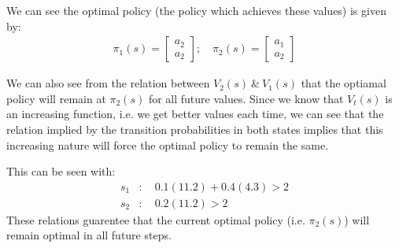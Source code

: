 \documentclass[11pt]{article}
\begin{document}
We can see the optimal policy (the policy which achieves these values) is given by:
\begin{align}
    \pi_1(s) = \begin{bmatrix}
        a_2 \\
        a_2
    \end{bmatrix};\quad
    \pi_2(s) = \begin{bmatrix}
        a_1 \\
        a_2
    \end{bmatrix}
\end{align}

We can also see from the relation between $V_2(s)\ \&\ V_1(s)$ that the optiamal policy will remain at $\pi_2(s)$ for all future values. 
Since we know that $V_t(s)$ is an increasing function, i.e. we get better values each time, we can see that the relation implied by the transition probabilities in both states implies that this increasing nature will force the optimal policy to remain the same. 

This can be seen with:
\begin{align}
    s_1&: \quad 0.1(11.2) + 0.4(4.3)>2 \\
    s_2&: \quad 0.2(11.2) > 2
\end{align}
These relations guarentee that the current optimal policy (i.e. $\pi_2(s)$) will remain optimal in all future steps.
\end{document}

